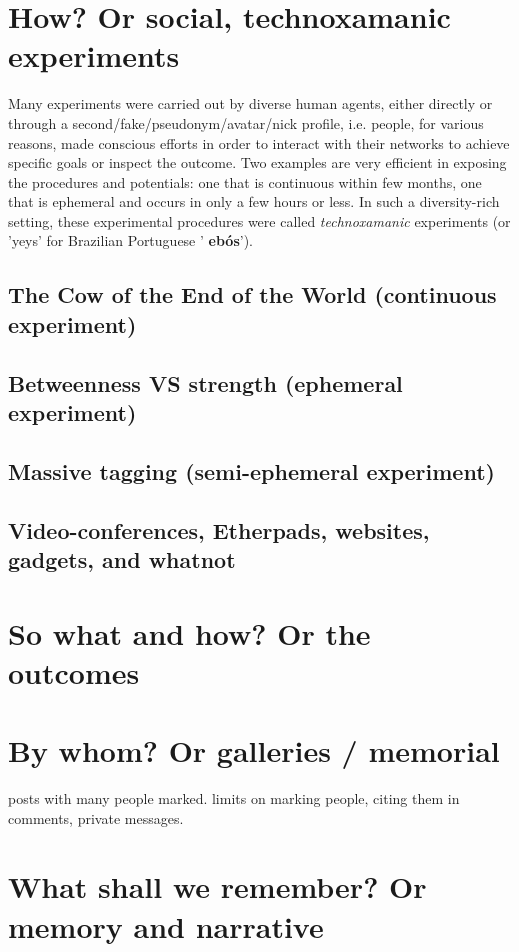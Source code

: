 \documentclass[a4paper]{article}
\begin{document}
\section{How? Or social, technoxamanic experiments}
Many experiments were carried out by diverse human agents, either directly or
through a second/fake/pseudonym/avatar/nick profile, i.e. people, for various
reasons, made conscious efforts in order to interact with their networks to
achieve specific goals or inspect the outcome.  Two examples are very efficient
in exposing the procedures and potentials: one that is continuous within few
months, one that is ephemeral and occurs in only a few hours or less.  In such
a diversity-rich setting, these experimental procedures were called
\emph{technoxamanic} experiments (or 'yeys' for Brazilian Portuguese '{\bf
ebós}').

\subsection{The Cow of the End of the World (continuous experiment)}

\subsection{Betweenness VS strength (ephemeral experiment)}

\subsection{Massive tagging (semi-ephemeral experiment)}

\subsection{Video-conferences, Etherpads, websites, gadgets, and whatnot}

      
\section{So what and how? Or the outcomes}

\section{By whom? Or galleries / memorial}
posts with many people marked.
limits on marking people, citing them in comments,
private messages.

\section{What shall we remember? Or memory and narrative}
\end{document}
